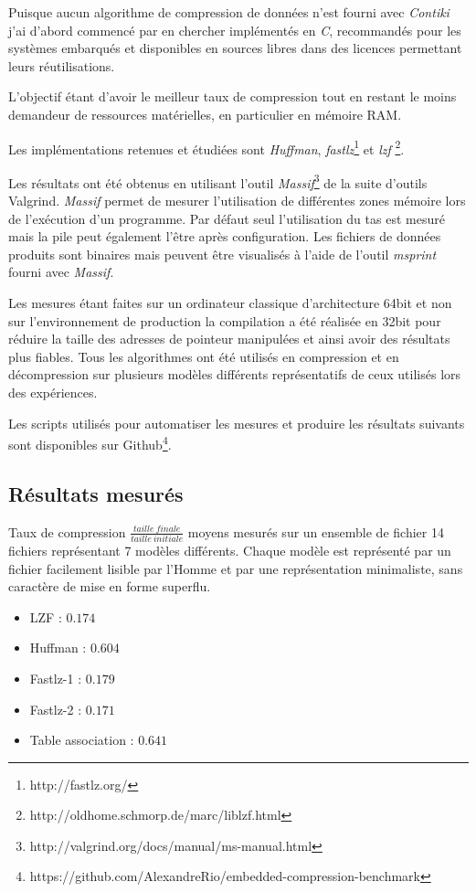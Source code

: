 Puisque aucun algorithme de compression de données n'est fourni avec \emph{Contiki} j'ai d'abord commencé par en chercher implémentés en \emph{C}, recommandés pour les systèmes embarqués et disponibles en sources libres dans des licences permettant leurs réutilisations.

L'objectif étant d'avoir le meilleur taux de compression tout en restant le moins demandeur de ressources matérielles, en particulier en mémoire RAM.

Les implémentations retenues et étudiées sont \emph{Huffman}, \emph{fastlz}\footnote{http://fastlz.org/} et \emph{lzf} \footnote{http://oldhome.schmorp.de/marc/liblzf.html}.

Les résultats ont été obtenus en utilisant l'outil \emph{Massif}\footnote{http://valgrind.org/docs/manual/ms-manual.html} de la suite d'outils Valgrind. \emph{Massif} permet de mesurer l'utilisation de différentes zones mémoire lors de l'exécution d'un programme. Par défaut seul l'utilisation du tas est mesuré mais la pile peut également l'être après configuration. Les fichiers de données produits sont binaires mais peuvent être visualisés à l'aide de l'outil \emph{msprint} fourni avec \emph{Massif}.

Les mesures étant faites sur un ordinateur classique d'architecture 64bit et non sur l'environnement de production la compilation a été réalisée en 32bit pour réduire la taille des adresses de pointeur manipulées et ainsi avoir des résultats plus fiables. Tous les algorithmes ont été utilisés en compression et en décompression sur plusieurs modèles différents représentatifs de ceux utilisés lors des expériences.

Les scripts utilisés pour automatiser les mesures et produire les résultats suivants sont disponibles sur Github\footnote{https://github.com/AlexandreRio/embedded-compression-benchmark}.

\subsection{Résultats mesurés}

Taux de compression $\frac{taille~finale}{taille~initiale}$ moyens mesurés sur un ensemble de fichier 14 fichiers représentant 7 modèles différents. Chaque modèle est représenté par un fichier facilement lisible par l'Homme et par une représentation minimaliste, sans caractère de mise en forme superflu.

\begin{itemize}
\item LZF : $0.174$
\item Huffman : $0.604$
\item Fastlz-1 : $0.179$
\item Fastlz-2 : $0.171$
\item Table association : $0.641$
\end{itemize}

